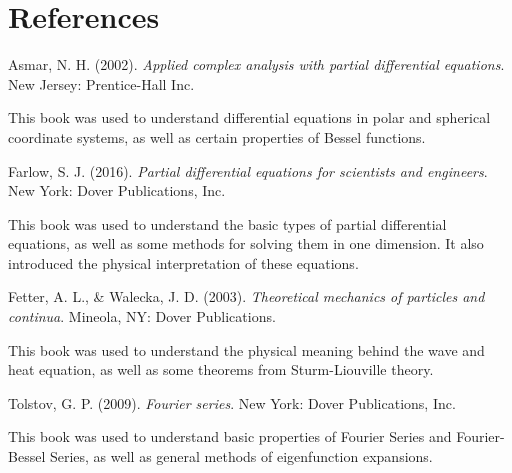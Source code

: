 \documentclass{paper}
\begin{document}
\section{References}
Asmar, N. H. (2002). \textit{Applied complex analysis with partial differential equations}. New Jersey: Prentice-Hall Inc.\\
\begin{adjustwidth}{2 cm}{}
This book was used to understand differential equations in polar and spherical coordinate systems, as well as certain properties of Bessel functions.\\
\end{adjustwidth}
Farlow, S. J. (2016). \textit{Partial differential equations for scientists and engineers}. New York: Dover Publications, Inc.\\
\begin{adjustwidth}{2 cm}{}
This book was used to understand the basic types of partial differential equations, as well as some methods for solving them in one dimension. It also introduced the physical interpretation of these equations.\\
\end{adjustwidth}
Fetter, A. L., \& Walecka, J. D. (2003). \textit{Theoretical mechanics of particles and continua}. Mineola, NY: Dover Publications. \\
\begin{adjustwidth}{2 cm}{}
This book was used to understand the physical meaning behind the wave and heat equation, as well as some theorems from Sturm-Liouville theory.\\
\end{adjustwidth}
Tolstov, G. P. (2009). \textit{Fourier series}. New York: Dover Publications, Inc.\\
\begin{adjustwidth}{2 cm}{}
This book was used to understand basic properties of Fourier Series and Fourier-Bessel Series, as well as general methods of eigenfunction expansions.
\end{adjustwidth}
\end{document}
